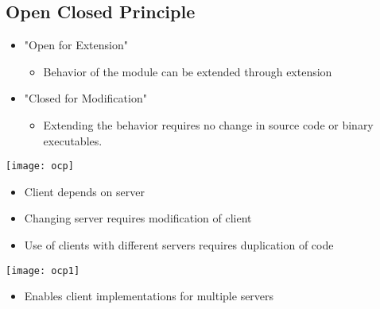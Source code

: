 \documentclass[xcolor=svgnames, handout]{beamer}
\begin{document}

\subsection{Open Closed Principle}


\begin{frame}{\subsecname}

    \begin{itemize}
        \pause \item "Open for Extension"
        \begin{itemize}
            \pause \item Behavior of the module can be extended through
                extension
        \end{itemize}
        \pause \item "Closed for Modification"
        \begin{itemize}
            \pause \item Extending the behavior requires no change in source
                code or binary executables.
        \end{itemize}
    \end{itemize}

\end{frame}


\begin{frame}{\subsecname}
    \centering
    \texttt{[image: ocp]}
    \begin{itemize}
        \pause \item Client depends on server
        \pause \item Changing server requires modification of client
        \pause \item Use of clients with different servers requires duplication
            of code
    \end{itemize}
\end{frame}


\begin{frame}{\subsecname}
    \centering
    \texttt{[image: ocp1]}
    \begin{itemize}
        \pause \item Enables client implementations for multiple servers
    \end{itemize}
\end{frame}
\end{document}
